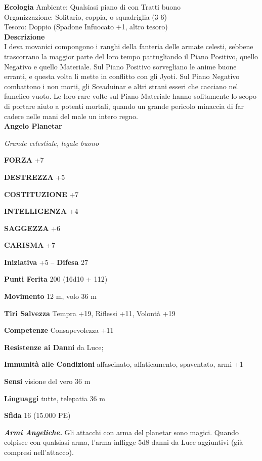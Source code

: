 \begin{multicols}{2}
\textbf{Ecologia}
Ambiente: Qualsiasi piano di con Tratti buono\\
Organizzazione: Solitario, coppia, o squadriglia (3-6)\\
Tesoro: Doppio (Spadone Infuocato +1, altro tesoro)\\
\textbf{Descrizione}\\
I deva movanici compongono i ranghi della fanteria delle armate celesti, sebbene trascorrano la maggior parte del loro tempo pattugliando il Piano Positivo, quello Negativo e quello Materiale. Sul Piano Positivo sorvegliano le anime buone erranti, e questa volta li mette in conflitto con gli Jyoti. Sul Piano Negativo combattono i non morti, gli Sceaduinar e altri strani esseri che cacciano nel famelico vuoto. Le loro rare volte sul Piano Materiale hanno solitamente lo scopo di portare aiuto a potenti mortali, quando un grande pericolo minaccia di far cadere nelle mani del male un intero regno.\\


\medskip{}\textbf{Angelo Planetar}

\emph{Grande celestiale, legale buono}

\textbf{FORZA} +7

\textbf{DESTREZZA} +5

\textbf{COSTITUZIONE} +7

\textbf{INTELLIGENZA} +4

\textbf{SAGGEZZA} +6

\textbf{CARISMA} +7

\textbf{Iniziativa} +5 -- \textbf{Difesa} 27

\textbf{Punti Ferita} 200 (16d10 + 112)

\textbf{Movimento} 12 m, volo 36 m

\textbf{Tiri Salvezza} Tempra +19, Riflessi +11, Volontà +19

\textbf{Competenze} Consapevolezza +11

\textbf{Resistenze ai Danni} da Luce;

\textbf{Immunità alle Condizioni} affascinato, affaticamento, spaventato, armi +1

\textbf{Sensi} visione del vero 36 m

\textbf{Linguaggi} tutte, telepatia 36 m

\textbf{Sfida} 16 (15.000 PE)

\emph{\textbf{Armi Angeliche.}} Gli attacchi con arma del planetar sono magici. Quando colpisce con qualsiasi arma, l'arma infligge 5d8 danni da Luce aggiuntivi (già compresi nell'attacco).


\end{multicols}
